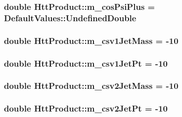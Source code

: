 \hypertarget{classHttProduct_aff72a2230f489c350ef7c9e484ad1fe6}{
\subsubsection[{m\_\-cosPsiPlus}]{\setlength{\rightskip}{0pt plus 5cm}double {\bf HttProduct::m\_\-cosPsiPlus} = DefaultValues::UndefinedDouble}}
\label{classHttProduct_aff72a2230f489c350ef7c9e484ad1fe6}
\hypertarget{classHttProduct_a58b4fd27f0f6ff1a9abe8ba113e137fb}{
\subsubsection[{m\_\-csv1JetMass}]{\setlength{\rightskip}{0pt plus 5cm}double {\bf HttProduct::m\_\-csv1JetMass} = -\/10}}
\label{classHttProduct_a58b4fd27f0f6ff1a9abe8ba113e137fb}
\hypertarget{classHttProduct_a24c512c316b95df8293cc5fb66a146bc}{
\subsubsection[{m\_\-csv1JetPt}]{\setlength{\rightskip}{0pt plus 5cm}double {\bf HttProduct::m\_\-csv1JetPt} = -\/10}}
\label{classHttProduct_a24c512c316b95df8293cc5fb66a146bc}
\hypertarget{classHttProduct_ac5607acc08338d09bda39eb55684acb9}{
\subsubsection[{m\_\-csv2JetMass}]{\setlength{\rightskip}{0pt plus 5cm}double {\bf HttProduct::m\_\-csv2JetMass} = -\/10}}
\label{classHttProduct_ac5607acc08338d09bda39eb55684acb9}
\hypertarget{classHttProduct_a4cc75b7222fe46c6a57933454a69c859}{
\subsubsection[{m\_\-csv2JetPt}]{\setlength{\rightskip}{0pt plus 5cm}double {\bf HttProduct::m\_\-csv2JetPt} = -\/10}}
